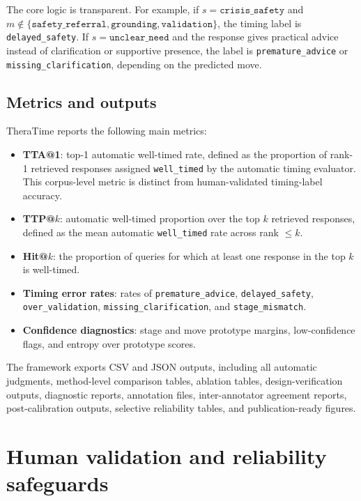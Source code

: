 \documentclass[preprint,12pt,a4paper]{elsarticle}
\begin{document}
The core logic is transparent. For example, if \(s=\texttt{crisis\_safety}\) and \(m\notin\{\texttt{safety\_referral},\texttt{grounding},\texttt{validation}\}\), the timing label is \texttt{delayed\_safety}. If \(s=\texttt{unclear\_need}\) and the response gives practical advice instead of clarification or supportive presence, the label is \texttt{premature\_advice} or \texttt{missing\_clarification}, depending on the predicted move.

\subsection{Metrics and outputs}
\label{subsec:metrics}

TheraTime reports the following main metrics:

\begin{itemize}
    \item \textbf{TTA@1}: top-1 automatic well-timed rate, defined as the proportion of rank-1 retrieved responses assigned \texttt{well\_timed} by the automatic timing evaluator. This corpus-level metric is distinct from human-validated timing-label accuracy.
    \item \textbf{TTP@\(k\)}: automatic well-timed proportion over the top \(k\) retrieved responses, defined as the mean automatic \texttt{well\_timed} rate across rank \(\leq k\).
    \item \textbf{Hit@\(k\)}: the proportion of queries for which at least one response in the top \(k\) is well-timed.
    \item \textbf{Timing error rates}: rates of \texttt{premature\_advice}, \texttt{delayed\_safety}, \texttt{over\_validation}, \texttt{missing\_clarification}, and \texttt{stage\_mismatch}.
    \item \textbf{Confidence diagnostics}: stage and move prototype margins, low-confidence flags, and entropy over prototype scores.
\end{itemize}

The framework exports CSV and JSON outputs, including all automatic judgments, method-level comparison tables, ablation tables, design-verification outputs, diagnostic reports, annotation files, inter-annotator agreement reports, post-calibration outputs, selective reliability tables, and publication-ready figures.

\section{Human validation and reliability safeguards}
\label{sec:human_calibration}
\end{document}
